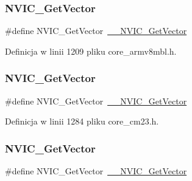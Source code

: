 \subsubsection{\texorpdfstring{N\+V\+I\+C\+\_\+\+Get\+Vector}{NVIC\_GetVector}\hspace{0.1cm}{\footnotesize\ttfamily [5/12]}}
{\footnotesize\ttfamily \#define N\+V\+I\+C\+\_\+\+Get\+Vector~\hyperlink{group___c_m_s_i_s___core___n_v_i_c_functions_ga44b665d2afb708121d9b10c76ff00ee5}{\+\_\+\+\_\+\+N\+V\+I\+C\+\_\+\+Get\+Vector}}



Definicja w linii 1209 pliku core\+\_\+armv8mbl.\+h.

\mbox{\label{group___c_m_s_i_s___core___n_v_i_c_functions_ga955eb1c33a3dcc62af11a8385e8c0fc8}} 
\subsubsection{\texorpdfstring{N\+V\+I\+C\+\_\+\+Get\+Vector}{NVIC\_GetVector}\hspace{0.1cm}{\footnotesize\ttfamily [6/12]}}
{\footnotesize\ttfamily \#define N\+V\+I\+C\+\_\+\+Get\+Vector~\hyperlink{group___c_m_s_i_s___core___n_v_i_c_functions_ga44b665d2afb708121d9b10c76ff00ee5}{\+\_\+\+\_\+\+N\+V\+I\+C\+\_\+\+Get\+Vector}}



Definicja w linii 1284 pliku core\+\_\+cm23.\+h.

\mbox{\label{group___c_m_s_i_s___core___n_v_i_c_functions_ga955eb1c33a3dcc62af11a8385e8c0fc8}} 
\subsubsection{\texorpdfstring{N\+V\+I\+C\+\_\+\+Get\+Vector}{NVIC\_GetVector}\hspace{0.1cm}{\footnotesize\ttfamily [7/12]}}
{\footnotesize\ttfamily \#define N\+V\+I\+C\+\_\+\+Get\+Vector~\hyperlink{group___c_m_s_i_s___core___n_v_i_c_functions_ga44b665d2afb708121d9b10c76ff00ee5}{\+\_\+\+\_\+\+N\+V\+I\+C\+\_\+\+Get\+Vector}}



